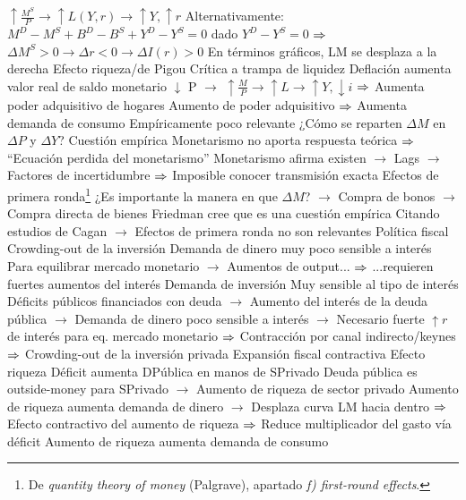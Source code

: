 \documentclass{nuevotema}
\begin{document}
\begin{esquemal}
				\4[] $\uparrow \frac{M^S}{P} \to \uparrow L(Y,r) \to \uparrow Y, \uparrow r$
				\4[] Alternativamente:
				\4[] $M^D - M^S + B^D - B^S + Y^D - Y^S = 0$ dado $Y^D - Y^S = 0$
				\4[] $\Rightarrow$ $\Delta M^S >0  \to \Delta r <0 \to \Delta I(r) >0$
				\4[] En términos gráficos, LM se desplaza a la derecha
				\4 Efecto riqueza/de Pigou
				\4[] Crítica a trampa de liquidez
				\4[] Deflación aumenta valor real de saldo monetario
				\4[] $\downarrow$ P $\to$ $\uparrow \frac{M}{P} \to \uparrow L \to \uparrow Y, \downarrow i$
				\4[] $\Rightarrow$ Aumenta poder adquisitivo de hogares
				\4[] Aumento de poder adquisitivo
				\4[] $\Rightarrow$ Aumenta demanda de consumo
				\4[] Empíricamente poco relevante
				\4 ¿Cómo se reparten $\Delta M$ en $\Delta P$ y $\Delta Y$?
				\4[] Cuestión empírica
				\4[] Monetarismo no aporta respuesta teórica
				\4[] $\Rightarrow$ ``Ecuación perdida del monetarismo''
				\4[] Monetarismo afirma existen
				\4[] $\to$ Lags
				\4[] $\to$ Factores de incertidumbre
				\4[] $\Rightarrow$ Imposible conocer transmisión exacta
				\4 Efectos de primera ronda\footnote{De \textit{quantity theory of money} (Palgrave), apartado \textit{f) first-round effects}.}
				\4[] ¿Es importante la manera en que $\Delta M$?
				\4[] $\to$ Compra de bonos
				\4[] $\to$ Compra directa de bienes
				\4[] Friedman cree que es una cuestión empírica
				\4[] Citando estudios de Cagan
				\4[] $\to$ Efectos de primera ronda no son relevantes
		\2 Política fiscal
			\3 Crowding-out de la inversión
				\4 Demanda de dinero muy poco sensible a interés
				\4[] Para equilibrar mercado monetario
				\4[] $\to$ Aumentos de output...
				\4[] $\Rightarrow$ ...requieren fuertes aumentos del interés
				\4 Demanda de inversión
				\4[] Muy sensible al tipo de interés
				\4[] Déficits públicos financiados con deuda
				\4[] $\to$ Aumento del interés de la deuda pública
				\4[] $\to$ Demanda de dinero poco sensible a interés
				\4[] $\to$ Necesario fuerte $\uparrow r$ de interés para eq. mercado monetario
				\4[] $\Rightarrow$ Contracción por canal indirecto/keynes
				\4[] $\Rightarrow$ Crowding-out de la inversión privada
			\3 Expansión fiscal contractiva
				\4 Efecto riqueza
				\4[] Déficit aumenta DPública en manos de SPrivado
				\4[] Deuda pública es outside-money para SPrivado
				\4[] $\to$ Aumento de riqueza de sector privado
				\4[] Aumento de riqueza aumenta demanda de dinero
				\4[] $\to$ Desplaza curva LM hacia dentro
				\4[] $\Rightarrow$ Efecto contractivo del aumento de riqueza
				\4[] $\Rightarrow$ Reduce multiplicador del gasto vía déficit
				\4[] Aumento de riqueza aumenta demanda de consumo

\end{esquemal}
\end{document}
